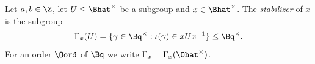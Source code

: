 Let $a,b\in\Z$, let $U\le\Bhat^\times$ be a subgroup and $x\in\Bhat^\times$. The \emph{stabilizer} of $x$ is the subgroup
\[
  \Gamma_x(U)=\{\gamma\in\Bq^\times:\iota(\gamma)\in xUx^{-1}\}\le\Bq^\times.
\]
For an order $\Oord$ of $\Bq$ we write $\Gamma_x=\Gamma_x(\Ohat^\times)$.
